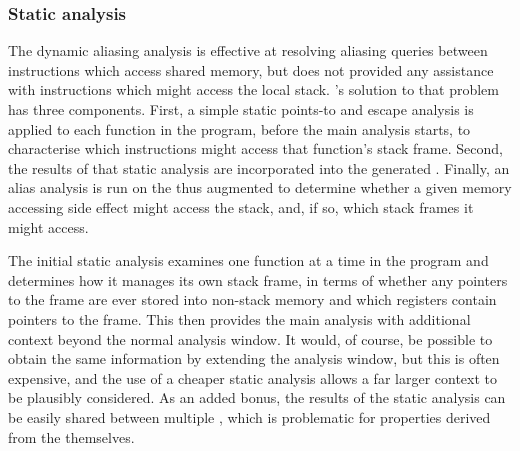 
\subsubsection{Static analysis}

\label{sect:static_analysis}



The dynamic aliasing analysis is effective at resolving aliasing
queries between instructions which access shared memory, but does not
provided any assistance with instructions which might access the local
stack.  {\Technique}'s solution to that problem has three components.
First, a simple static points-to and escape analysis is applied to
each function in the program, before the main analysis starts, to
characterise which instructions might access that function's stack
frame.  Second, the results of that static analysis are incorporated
into the generated {\StateMachines}.  Finally, an alias analysis is
run on the thus augmented {\StateMachines} to determine whether a
given memory accessing side effect might access the stack, and, if so,
which stack frames it might access.

The initial static analysis examines one function at a time in the
program and determines how it manages its own stack frame, in terms of
whether any pointers to the frame are ever stored into non-stack
memory and which registers contain pointers to the frame.  This then
provides the main analysis with additional context beyond the normal
analysis window.  It would, of course, be possible to obtain the same
information by extending the analysis window, but this is often expensive, and
the use of a cheaper static analysis allows a far larger context to be
plausibly considered.  As an added bonus, the results of the static
analysis can be easily shared between multiple {\StateMachines}, which
is problematic for properties derived from the {\StateMachines}
themselves.

